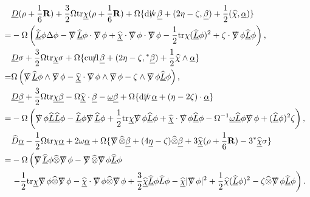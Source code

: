 \documentclass[11pt,reqno]{amsart}
\theoremstyle{definition}
\numberwithin{equation}{section}
\newcommand{\tr}{\mathrm{tr}}
\def\alphab{\underline{\alpha}}
\def\betab{\underline{\beta}}
\def\chib{\underline{\chi}}
\def\chibh{\widehat{\underline{\chi}}}
\def\chih{\widehat{\chi}}
\def\etab{\underline{\eta}}
\def\tr{\mathrm{tr}}
\def\omegab{\underline{\omega}}
\def\tensor{\widehat{\otimes}}
\def\Lh{\widehat{L}}
\def\Lbh{\widehat{\underline{L}}}
\newcommand{\Db}{\underline{D}}
\newcommand{\Dh}{\widehat{D}}
\def\nablas{\mbox{$\nabla \mkern -13mu /$ }}
\def\divs{\mbox{$\mathrm{div} \mkern -13mu /$ }}
\def\curls{\mbox{$\mathrm{curl} \mkern -13mu /$ }}
\def\ds{\mbox{$\nabla \mkern -13mu /$ }}
\begin{document}
\begin{align*}
&\Db(\rho+\frac{1}{6}\mathbf{R})+\frac{3}{2}\Omega\tr\chib (\rho+\frac{1}{6}\mathbf{R})+\Omega\{\divs \betab+(2\eta-\zeta,\betab)+\frac{1}{2}(\chih,\alphab)\}\\
=&-\Omega\left(\Lbh\phi\Delta\phi-\nablas\Lbh\phi\cdot\ds\phi+\chibh\cdot\ds\phi\cdot\ds\phi-\frac{1}{2}\tr\chi(\Lbh\phi)^2+\zeta\cdot\ds\phi\Lbh\phi\right),\\
&\Db\sigma+\frac{3}{2}\Omega\tr\chib\sigma+\Omega\{\curls\betab+(2\eta-\zeta,{}^*\betab)+\frac{1}{2}\chih\wedge\alphab\}\\
=&\Omega\left(\nablas\Lbh\phi\wedge\ds\phi-\chibh\cdot\ds\phi\wedge\ds\phi-\zeta\wedge\ds\phi\Lbh\phi\right),\\
&\Db\betab+\frac{3}{2}\Omega\tr\chib\betab-\Omega\chibh\cdot\betab-\omegab\betab+\Omega\{\divs\alphab+(\eta-2\zeta)\cdot\alphab\}\\
=&-\Omega\left(\ds\phi\Lbh\Lbh\phi-\Lbh\phi\nablas\Lbh\phi+\frac{1}{2}\tr\chib\ds\phi\Lbh\phi+\chibh\cdot\ds\phi\Lbh\phi-\Omega^{-1}\omegab\Lbh\phi\ds\phi+(\Lbh\phi)^2\zeta\right),\\
&\Dh\alphab-\frac{1}{2}\Omega\tr\chi \alphab+2\omega\alphab+\Omega\{\nablas\tensor\betab +(4\etab-\zeta)\tensor \betab+3\chibh (\rho+\frac{1}{6}\mathbf{R})-3{}^*\chibh \sigma\}\\
=&-\Omega\left(\nablas\Lbh\phi\tensor\ds\phi-\nablas\tensor\ds\phi\Lbh\phi\right.\\
&\left.-\frac{1}{2}\tr\chib\ds\phi\tensor\ds\phi-\chibh\cdot\ds\phi\tensor\ds\phi+\frac{3}{2}\chibh\Lbh\phi\Lh\phi-\chibh|\ds\phi|^2+\frac{1}{2}\chih(\Lbh\phi)^2-\zeta\tensor\ds\phi\Lbh\phi\right).\\
\end{align*}
\end{document}
